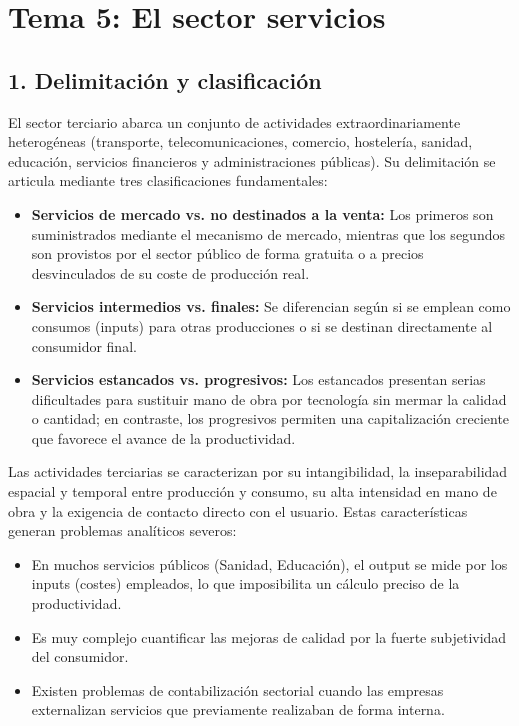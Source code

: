\clearpage
\section*{Tema 5: El sector servicios}

\subsection*{1. Delimitación y clasificación}

El sector terciario abarca un conjunto de actividades extraordinariamente heterogéneas (transporte, telecomunicaciones, comercio, hostelería, sanidad, educación, servicios financieros y administraciones públicas). Su delimitación se articula mediante tres clasificaciones fundamentales:

\begin{itemize}
  \item \textbf{Servicios de mercado vs. no destinados a la venta:} Los primeros son suministrados mediante el mecanismo de mercado, mientras que los segundos son provistos por el sector público de forma gratuita o a precios desvinculados de su coste de producción real.
  \item \textbf{Servicios intermedios vs. finales:} Se diferencian según si se emplean como consumos (inputs) para otras producciones o si se destinan directamente al consumidor final.
  \item \textbf{Servicios estancados vs. progresivos:} Los estancados presentan serias dificultades para sustituir mano de obra por tecnología sin mermar la calidad o cantidad; en contraste, los progresivos permiten una capitalización creciente que favorece el avance de la productividad.
\end{itemize}

Las actividades terciarias se caracterizan por su intangibilidad, la inseparabilidad espacial y temporal entre producción y consumo, su alta intensidad en mano de obra y la exigencia de contacto directo con el usuario. Estas características generan problemas analíticos severos:

\begin{itemize}
  \item En muchos servicios públicos (Sanidad, Educación), el output se mide por los inputs (costes) empleados, lo que imposibilita un cálculo preciso de la productividad.
  \item Es muy complejo cuantificar las mejoras de calidad por la fuerte subjetividad del consumidor.
  \item Existen problemas de contabilización sectorial cuando las empresas externalizan servicios que previamente realizaban de forma interna.
\end{itemize}

